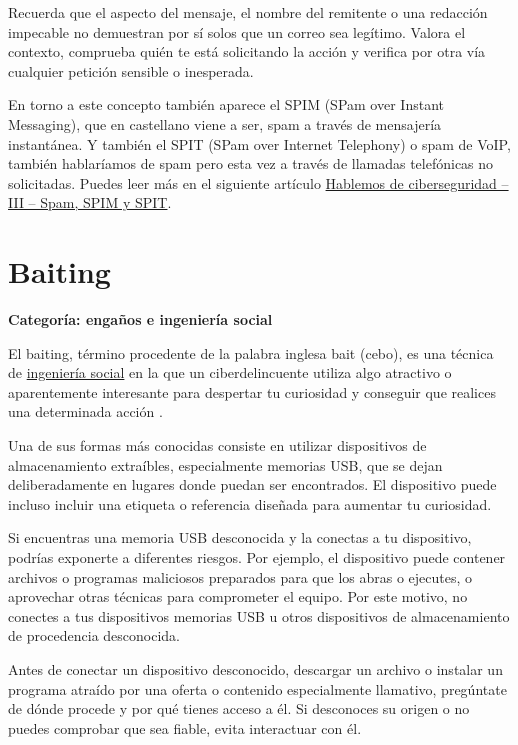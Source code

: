 \documentclass[
  spanish,
  a4paper,
  openany]{book}
\begin{document}
Recuerda que el aspecto del mensaje, el nombre del remitente o una redacción impecable no demuestran por sí solos que un correo sea legítimo. Valora el contexto, comprueba quién te está solicitando la acción y verifica por otra vía cualquier petición sensible o inesperada.

En torno a este concepto también aparece el SPIM (SPam over Instant Messaging), que en castellano viene a ser, spam a través de mensajería instantánea. Y también el SPIT (SPam over Internet Telephony) o spam de VoIP, también hablaríamos de spam pero esta vez a través de llamadas telefónicas no solicitadas. Puedes leer más en el siguiente artículo \href{https://www.iniseg.es/blog/ciberseguridad/hablemos-de-ciberseguridad-iii-spam-spim-y-spit/}{Hablemos de ciberseguridad -- III -- Spam, SPIM y SPIT}.

\section{Baiting}\label{baiting}

\textbf{Categoría: engaños e ingeniería social}

El baiting, término procedente de la palabra inglesa bait (cebo), es una técnica de \href{https://es.wikipedia.org/wiki/Ingeniería_social_(seguridad_informática)}{ingeniería social} en la que un ciberdelincuente utiliza algo atractivo o aparentemente interesante para despertar tu curiosidad y conseguir que realices una determinada acción \citep{baiting}.

Una de sus formas más conocidas consiste en utilizar dispositivos de almacenamiento extraíbles, especialmente memorias USB, que se dejan deliberadamente en lugares donde puedan ser encontrados. El dispositivo puede incluso incluir una etiqueta o referencia diseñada para aumentar tu curiosidad.

Si encuentras una memoria USB desconocida y la conectas a tu dispositivo, podrías exponerte a diferentes riesgos. Por ejemplo, el dispositivo puede contener archivos o programas maliciosos preparados para que los abras o ejecutes, o aprovechar otras técnicas para comprometer el equipo. Por este motivo, no conectes a tus dispositivos memorias USB u otros dispositivos de almacenamiento de procedencia desconocida.

Antes de conectar un dispositivo desconocido, descargar un archivo o instalar un programa atraído por una oferta o contenido especialmente llamativo, pregúntate de dónde procede y por qué tienes acceso a él. Si desconoces su origen o no puedes comprobar que sea fiable, evita interactuar con él.
\end{document}
